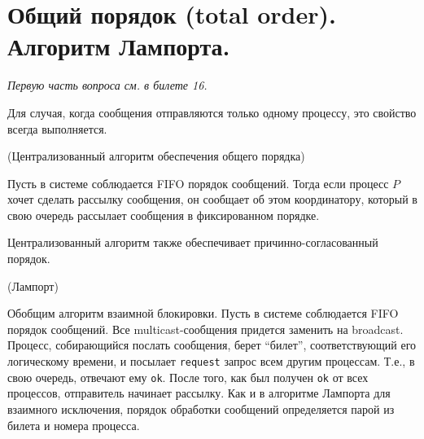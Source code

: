 \section{Общий порядок (total order). Алгоритм Лампорта.}

\textit{Первую часть вопроса см. в билете 16.}

\begin{remark}
    Для случая, когда сообщения отправляются только одному процессу, это
    свойство всегда выполняется.
\end{remark}

\begin{algorithm}(Централизованный алгоритм обеспечения общего порядка)

    Пусть в системе соблюдается FIFO порядок сообщений. Тогда если процесс
    $P$ хочет сделать рассылку сообщения, он сообщает об этом координатору,
    который в свою очередь рассылает сообщения в фиксированном порядке.
\end{algorithm}

\begin{remark}
    Централизованный алгоритм также обеспечивает причинно-согласованный порядок.
\end{remark}

\begin{algorithm}(Лампорт)
    
    Обобщим алгоритм взаимной блокировки. Пусть в системе соблюдается FIFO 
    порядок сообщений. Все multicast-сообщения придется заменить на broadcast.
    Процесс, собирающийся послать сообщения, берет ``билет'', соответствующий
    его логическому времени, и посылает \texttt{request} запрос всем другим
    процессам. Т.е., в свою очередь, отвечают ему \texttt{ok}. После того, как
    был получен \texttt{ok} от всех процессов, отправитель начинает рассылку.
    Как и в алгоритме Лампорта для взаимного исключения, порядок обработки сообщений
    определяется парой из билета и номера процесса.
\end{algorithm}

